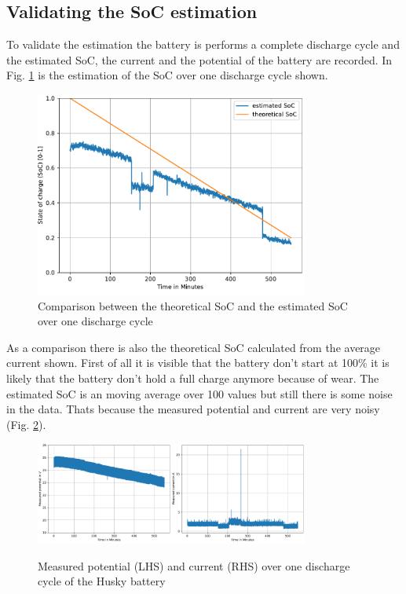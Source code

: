 \documentclass[conference]{IEEEtran}
\begin{document}
\subsection{Validating the SoC estimation}
To validate the estimation the battery is performs a complete discharge cycle and the estimated SoC, the current and the potential of the battery are recorded.
In Fig. \ref{fig:SoCUeberZeit} is the estimation of the SoC over one discharge cycle shown.\\

\begin{figure}[htbp]
    \centerline{\includegraphics[width=9cm]{Pictures/SoCUeberZeit.pdf}}
    \caption{Comparison between the theoretical SoC and the estimated SoC over one discharge cycle}
    \label{fig:SoCUeberZeit}
\end{figure}
As a comparison there is also the theoretical SoC calculated from the average current shown.
First of all it is visible that the battery don't start at 100\% it is likely that the battery don't hold a full charge anymore because of wear.
The estimated SoC is an moving average over 100 values but still there is some noise in the data.
Thats because the measured potential and current are very noisy (Fig. \ref{fig:SpannungStromUeberZeit}).
\begin{figure}[htbp]
    \centerline{\includegraphics[width=4.5cm]{Pictures/SpannungUeberZeit.pdf}\includegraphics[width=4.5cm]{Pictures/StormUeberZeit.pdf}}
    \caption{Measured potential (LHS) and current (RHS) over one discharge cycle of the Husky battery}
    \label{fig:SpannungStromUeberZeit}
\end{figure}
\end{document}
